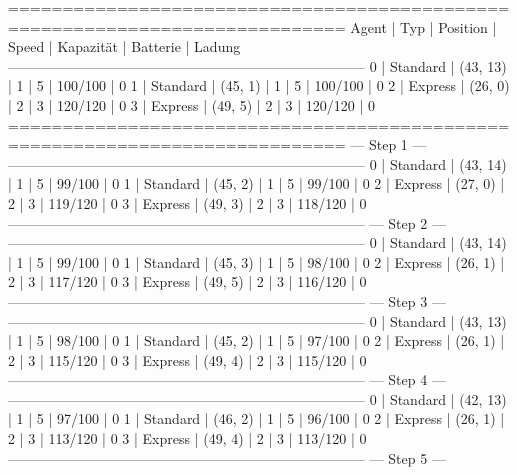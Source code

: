 =============================================================================
 Agent | Typ       | Position    | Speed   | Kapazität  | Batterie  | Ladung
-----------------------------------------------------------------------------
 0     | Standard  | (43, 13)    | 1       | 5          | 100/100   | 0
 1     | Standard  | (45, 1)     | 1       | 5          | 100/100   | 0
 2     | Express   | (26, 0)     | 2       | 3          | 120/120   | 0
 3     | Express   | (49, 5)     | 2       | 3          | 120/120   | 0
=============================================================================
                                --- Step 1 ---
-----------------------------------------------------------------------------
 0     | Standard  | (43, 14)    | 1       | 5          | 99/100    | 0
 1     | Standard  | (45, 2)     | 1       | 5          | 99/100    | 0
 2     | Express   | (27, 0)     | 2       | 3          | 119/120   | 0
 3     | Express   | (49, 3)     | 2       | 3          | 118/120   | 0
-----------------------------------------------------------------------------
                                --- Step 2 ---
-----------------------------------------------------------------------------
 0     | Standard  | (43, 14)    | 1       | 5          | 99/100    | 0
 1     | Standard  | (45, 3)     | 1       | 5          | 98/100    | 0
 2     | Express   | (26, 1)     | 2       | 3          | 117/120   | 0
 3     | Express   | (49, 5)     | 2       | 3          | 116/120   | 0
-----------------------------------------------------------------------------
                                --- Step 3 ---
-----------------------------------------------------------------------------
 0     | Standard  | (43, 13)    | 1       | 5          | 98/100    | 0
 1     | Standard  | (45, 2)     | 1       | 5          | 97/100    | 0
 2     | Express   | (26, 1)     | 2       | 3          | 115/120   | 0
 3     | Express   | (49, 4)     | 2       | 3          | 115/120   | 0
-----------------------------------------------------------------------------
                                --- Step 4 ---
-----------------------------------------------------------------------------
 0     | Standard  | (42, 13)    | 1       | 5          | 97/100    | 0
 1     | Standard  | (46, 2)     | 1       | 5          | 96/100    | 0
 2     | Express   | (26, 1)     | 2       | 3          | 113/120   | 0
 3     | Express   | (49, 4)     | 2       | 3          | 113/120   | 0
-----------------------------------------------------------------------------
                                --- Step 5 ---
